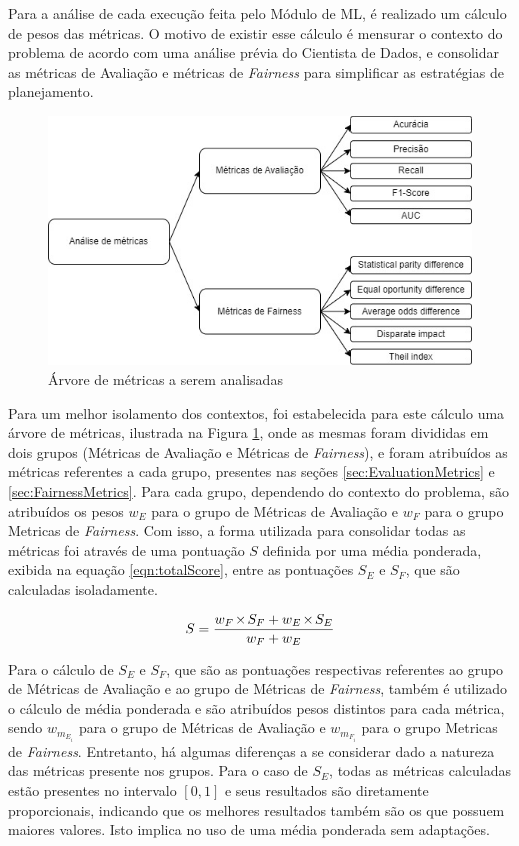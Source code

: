 \documentclass[portugues]{ic-tese}
\let\oldtimes\times
\def\times{{\mkern1mu\oldtimes\mkern1mu}}
\begin{document}
Para a análise de cada execução feita pelo Módulo de ML, é realizado um cálculo de pesos das métricas. O motivo de existir esse cálculo é mensurar o contexto do problema de acordo com uma análise prévia do Cientista de Dados, e consolidar as métricas de Avaliação e métricas de \textit{Fairness} para simplificar as estratégias de planejamento.

\begin{figure}[H]
\centering
\includegraphics[scale=0.6]{images/Arvore_Metricas.jpg}
\caption {Árvore de métricas a serem analisadas}
\label{fig:ArvoreMetricas}
\end{figure}

Para um melhor isolamento dos contextos, foi estabelecida para este cálculo uma árvore de métricas, ilustrada na Figura \ref{fig:ArvoreMetricas}, onde as mesmas foram divididas em dois grupos (Métricas de Avaliação e Métricas de \textit{Fairness}), e foram atribuídos as métricas referentes a cada grupo, presentes nas seções \ref{sec:EvaluationMetrics} e \ref{sec:FairnessMetrics}. Para cada grupo, dependendo do contexto do problema, são atribuídos os pesos $w_E$ para o grupo de Métricas de Avaliação e $w_F$ para o grupo Metricas de \textit{Fairness}. Com isso, a forma utilizada para consolidar todas as métricas foi através de uma pontuação $S$ definida por uma média ponderada, exibida na equação \ref{eqn:totalScore}, entre as pontuações $S_E$ e $S_F$, que são calculadas isoladamente.

\begin{equation}
\label{eqn:totalScore}
	S = \frac{w_F \times S_{F} + w_E \times S_{E}}{w_F + w_E}
\end{equation}

Para o cálculo de $S_E$ e $S_F$, que são as pontuações respectivas referentes ao grupo de Métricas de Avaliação e ao grupo de Métricas de \textit{Fairness}, também é utilizado o cálculo de média ponderada e são atribuídos pesos distintos para cada métrica, sendo $w_{m_{E_i}}$ para o grupo de Métricas de Avaliação e $w_{m_{F_i}}$ para o grupo Metricas de \textit{Fairness}. Entretanto, há algumas diferenças a se considerar dado a natureza das métricas presente nos grupos. Para o caso de $S_E$, todas as métricas calculadas estão presentes no intervalo $\left[0,1 \right]$ e seus resultados são diretamente proporcionais, indicando que os melhores resultados também são os que possuem maiores valores. Isto implica no uso de uma média ponderada sem adaptações.
\end{document}

